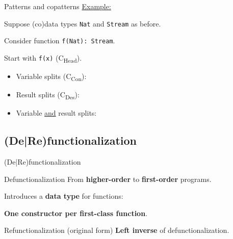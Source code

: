 \documentclass[xcolor=svgnames]{beamer}
\begin{document}
\begin{frame}
  {Patterns and copatterns}
\underline{Example:}

Suppose (co)data types \texttt{Nat} and \texttt{Stream} as before. 

Consider function \texttt{f(Nat): Stream}.

Start with \texttt{f(x)} (C\textsubscript{Head}).
    \begin{itemize}
      \item Variable splits (C\textsubscript{Con}):

         

      \item Result splits (C\textsubscript{Des}):

         

      \item Variable \underline{and} result splits:

         
    \end{itemize}



\end{frame}

\subsection
  {(De|Re)functionalization}


\begin{frame}
  {(De|Re)functionalization}

  \begin{block}{Defunctionalization \citep{reynolds72definitional}}
    From \textbf{higher-order} to \textbf{first-order} programs.

    Introduces a \textbf{data type} for functions:

    \textbf{One constructor per first-class function}.
  \end{block}

  \begin{block}{Refunctionalization (original form) \citep{danvy09refunctionalization}}
    \textbf{Left inverse} of defunctionalization.
  \end{block}
\end{frame}
\end{document}
